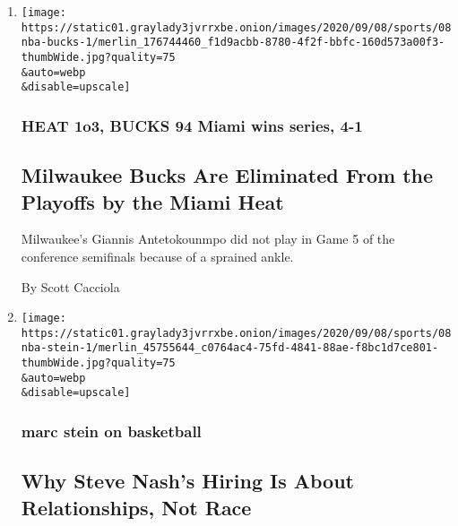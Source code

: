 \begin{enumerate}
\def\labelenumi{\arabic{enumi}.}
\item
  \href{/2020/09/08/sports/basketball/nba-milwaukee-bucks-miami-heat-giannis.html}{}

  \texttt{[image: https://static01.graylady3jvrrxbe.onion/images/2020/09/08/sports/08nba-bucks-1/merlin\_176744460\_f1d9acbb-8780-4f2f-bbfc-160d573a00f3-thumbWide.jpg?quality=75\\\&auto=webp\\\&disable=upscale]}

  \hypertarget{heat-1o3-bucks-94--miami-wins-series-4-1}{%
  \subsubsection{HEAT 1o3, BUCKS 94 \textbar{} Miami wins series,
  4-1}\label{heat-1o3-bucks-94--miami-wins-series-4-1}}

  \hypertarget{milwaukee-bucks-are-eliminated-from-the-playoffs-by-the-miami-heat}{%
  \subsection{Milwaukee Bucks Are Eliminated From the Playoffs by the
  Miami
  Heat}\label{milwaukee-bucks-are-eliminated-from-the-playoffs-by-the-miami-heat}}

  Milwaukee's Giannis Antetokounmpo did not play in Game 5 of the
  conference semifinals because of a sprained ankle.

  By Scott Cacciola
\item
  \href{/2020/09/08/sports/basketball/steve-nash-nets-diversity.html}{}

  \texttt{[image: https://static01.graylady3jvrrxbe.onion/images/2020/09/08/sports/08nba-stein-1/merlin\_45755644\_c0764ac4-75fd-4841-88ae-f8bc1d7ce801-thumbWide.jpg?quality=75\\\&auto=webp\\\&disable=upscale]}

  \hypertarget{marc-stein-on-basketball}{%
  \subsubsection{marc stein on
  basketball}\label{marc-stein-on-basketball}}

  \hypertarget{why-steve-nashs-hiring-is-about-relationships-not-race}{%
  \subsection{Why Steve Nash's Hiring Is About Relationships, Not
  Race}\label{why-steve-nashs-hiring-is-about-relationships-not-race}}


\end{enumerate}
